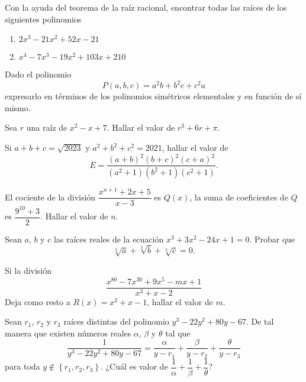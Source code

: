 \begin{exercise}
    Con la ayuda del teorema de la raíz racional, encontrar todas las raíces de los siguientes polinomios
    \begin{enumerate}
        \item $2 x^3 - 21 x^2 + 52 x - 21$
        \item $x^4 - 7 x^3 - 19 x^2 + 103 x + 210$
    \end{enumerate}
\end{exercise}

\begin{multicols}{2}
\begin{exercise}
    Dado el polinomio $$P(a,b, c) = a^2 b + b^2 c + c^2 a$$ expresarlo en términos de los polinomios simétricos elementales y en función de sí mismo.
\end{exercise}

\begin{problem}
    Sea $r$ una raíz de $x^2 - x + 7$.
    Hallar el valor de $r^3 + 6r + \pi$.
\end{problem}

\begin{problem}
    Si $a + b + c = \sqrt{2023}$ y $a^2 + b^2 + c^2 = 2021$, hallar el valor de
    \[
        E = \frac{(a + b)^2 (b + c)^2 (c + a)^2}{(a^2 + 1) (b^2 + 1) (c^2 + 1)}.
    \]
\end{problem}

\begin{problem}
    El cociente de la división $\dfrac{x^{n + 1} + 2x + 5}{x - 3}$ es $Q(x)$, la suma de coeficientes de $Q$ es $\dfrac{9^{10} + 3}{2}$.
    Hallar el valor de $n$.
\end{problem}

\end{multicols}

\begin{problem}
    Sean $a$, $b$ y $c$ las raíces reales de la ecuación $x^3 + 3x^2 - 24x + 1 = 0$.
    Probar que
    \[
        \sqrt[3]{a} + \sqrt[3]{b} + \sqrt[3]{c} = 0.
    \]
\end{problem}

\begin{problem}
    Si la división
    \[\frac{x^{80} - 7 x^{30} + 9x^5 - mx + 1}{x^3 + x - 2}\]
    Deja como resto a $R(x) = x^2 + x - 1$, hallar el valor de $m$.
\end{problem}

\begin{problem}
    Sean $r_1$, $r_2$ y $r_3$ raíces distintas del polinomio $y^3 - 22 y^2 + 80 y - 67$.
    De tal manera que existen números reales $\alpha$, $\beta$ y $\theta$ tal que
    \[
        \frac{1}{y^3 - 22 y^2 + 80 y - 67} = \frac{\alpha}{y - r_1} + \frac{\beta}{y - r_2} + \frac{\theta}{y - r_3}
    \]
    para toda $y \notin \left\{ r_1, r_2, r_3 \right\}$.
    ¿Cuál es valor de $\dfrac{1}{\alpha} + \dfrac{1}{\beta} + \dfrac{1}{\theta}$?
\end{problem}

